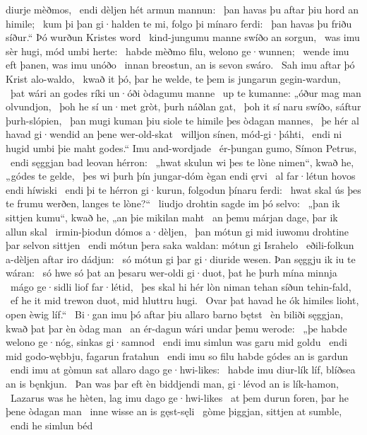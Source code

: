diurje mèðmos, \hld\ endi dèljen hét
armun mannun: \hld\ þan havas þu aftar þiu
hord an himile; \hld\ kum þi þan gi·halden te mi,
folgo þi mínaro ferdi: \hld\ þan havas þu friðu síður.“
Þó wurðun Kristes word \hld\ kind-jungumu manne
swíðo an sorgun, \hld\ was imu sèr hugi,
mód umbi herte: \hld\ habde mèðmo filu,
welono ge·wunnen; \hld\ wende imu eft þanen,
was imu unóðo \hld\ innan breostun,
an is sevon swáro. \hld\ Sah imu aftar þó
Krist alo-waldo, \hld\ kwað it þó, þar he welde,
te þem is jungarun gegin-wardun, \hld\ þat wári an godes ríki
un·óði òdagumu manne \hld\ up te kumanne:
„óður mag man olvundjon, \hld\ þoh he sí un·met gròt,
þurh náðlan gat, \hld\ þoh it sí naru swíðo,
sáftur þurh-slópien, \hld\ þan mugi kuman þiu siole te himile
þes òdagan mannes, \hld\ þe hér al havad
gi·wendid an þene wer-old-skat \hld\ willjon sínen,
mód-gi·þáhti, \hld\ endi ni hugid umbi þie maht godes.“
Imu and-wordjade \hld\ ér-þungan gumo,
Símon Petrus, \hld\ endi sęggjan bad
leovan hérron: \hld\ „hwat skulun wi þes te lòne nimen“, kwað he,
„gódes te gelde, \hld\ þes wi þurh þín jungar-dóm
ègan endi ęrvi \hld\ al far·létun
hovos endi híwiski \hld\ endi þi te hérron gi·kurun,
folgodun þínaru ferdi: \hld\ hwat skal ús þes te frumu werðen,
langes te lòne?“ \hld\ liudjo drohtin
sagde im þó selvo: \hld\ „þan ik sittjen kumu“, kwað he,
„an þie mikilan maht \hld\ an þemu márjan dage,
þar ik allun skal \hld\ irmin-þiodun
dómos a·dèljen, \hld\ þan mótun gi mid iuwomu drohtine þar
selvon sittjen \hld\ endi mótun þera saka waldan:
mótun gi Israhelo \hld\ eðili-folkun
a-dèljen aftar iro dádjun: \hld\ só mótun gi þar gi·diuride wesen.
Þan sęggju ik iu te wáran: \hld\ só hwe só þat an þesaru wer-oldi gi·duot,
þat he þurh mína minnja \hld\ mágo ge·sidli
liof far·létid, \hld\ þes skal hi hér lòn niman
tehan síðun tehin-fald, \hld\ ef he it mid trewon duot,
mid hluttru hugi. \hld\ Ovar þat havad he ók himiles lioht,
open èwig líf.“ \hld\ Bi·gan imu þó aftar þiu
allaro barno bętst \hld\ èn biliði sęggjan,
kwað þat þar èn òdag man \hld\ an ér-dagun
wári undar þemu werode: \hld\ „þe habde welono ge·nóg,
sinkas gi·samnod \hld\ endi imu simlun was
garu mid goldu \hld\ endi mid godo-wębbju,
fagarun fratahun \hld\ endi imu so filu habde
gódes an is gardun \hld\ endi imu at gòmun sat
allaro dago ge·hwi-likes: \hld\ habde imu diur-lík líf,
blíðsea an is bęnkjun. \hld\ Þan was þar eft èn biddjendi man,
gi·lévod an is lík-hamon, \hld\ Lazarus was he hèten,
lag imu dago ge·hwi-likes \hld\ at þem durun foren,
þar he þene òdagan man \hld\ inne wisse
an is gęst-sęli \hld\ gòme þiggjan,
sittjen at sumble, \hld\ endi he simlun béd
